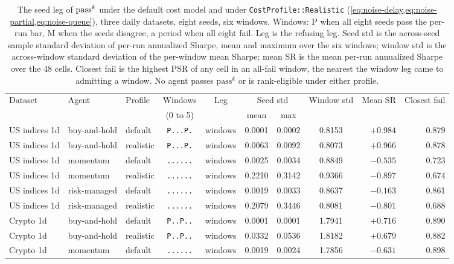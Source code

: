 \begin{table}[t]
\centering
\footnotesize
\setlength{\tabcolsep}{3.5pt}
\caption{The seed leg of $\text{pass}^{k}$ under the default cost model and under \texttt{CostProfile::Realistic} (\cref{eq:noise-delay,eq:noise-partial,eq:noise-queue}), three daily datasets, eight seeds, six windows. Windows: P when all eight seeds pass the per-run bar, M when the seeds disagree, a period when all eight fail. Leg is the refusing leg. Seed std is the across-seed sample standard deviation of per-run annualized Sharpe, mean and maximum over the six windows; window std is the across-window standard deviation of the per-window mean Sharpe; mean SR is the mean per-run annualized Sharpe over the 48 cells. Closest fail is the highest PSR of any cell in an all-fail window, the nearest the window leg came to admitting a window. No agent passes $\text{pass}^{k}$ or is rank-eligible under either profile.}
\label{tab:seedleg}
\begin{tabular}{lllcccccrr}
\toprule
Dataset & Agent & Profile & Windows & Leg & \multicolumn{2}{c}{Seed std} & Window std & Mean SR & Closest fail \\
 & & & (0 to 5) & & mean & max & & & \\
\midrule
US indices 1d & buy-and-hold & default   & \texttt{P...P.} & windows & 0.0001 & 0.0002 & 0.8153 & $+0.984$ & 0.879 \\
US indices 1d & buy-and-hold & realistic & \texttt{P...P.} & windows & 0.0063 & 0.0092 & 0.8073 & $+0.966$ & 0.878 \\
US indices 1d & momentum     & default   & \texttt{......} & windows & 0.0025 & 0.0034 & 0.8849 & $-0.535$ & 0.723 \\
US indices 1d & momentum     & realistic & \texttt{......} & windows & 0.2210 & 0.3142 & 0.9366 & $-0.897$ & 0.674 \\
US indices 1d & risk-managed & default   & \texttt{......} & windows & 0.0019 & 0.0033 & 0.8637 & $-0.163$ & 0.861 \\
US indices 1d & risk-managed & realistic & \texttt{......} & windows & 0.2079 & 0.3446 & 0.8081 & $-0.801$ & 0.688 \\
\midrule
Crypto 1d     & buy-and-hold & default   & \texttt{P..P..} & windows & 0.0001 & 0.0001 & 1.7941 & $+0.716$ & 0.890 \\
Crypto 1d     & buy-and-hold & realistic & \texttt{P..P..} & windows & 0.0332 & 0.0536 & 1.8182 & $+0.679$ & 0.882 \\
Crypto 1d     & momentum     & default   & \texttt{......} & windows & 0.0019 & 0.0024 & 1.7856 & $-0.631$ & 0.898 \\

\end{tabular}
\end{table}
